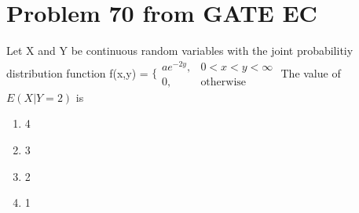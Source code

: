 \documentclass[journal,12pt,twocolumn]{IEEEtran}
\begin{document}
\section{\textbf{Problem 70 from GATE EC}}
Let X and Y be continuous random variables with the joint probabilitiy distribution function\newline
f(x,y) = $\bigg\{ \begin{array}{lr}
    ae^{-2y}, & 0<x<y<\infty  \\
     0, &\text{otherwise} 
\end{array}$\newline
The value of $E(X|Y=2)$ is \newline
\begin{enumerate}
\item 4 
\item 3 
\item 2 
\item 1 
\end{enumerate}
\end{document}
